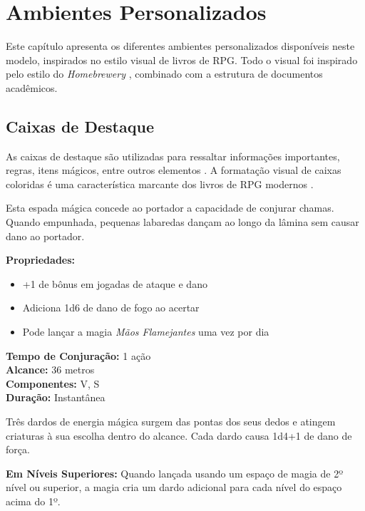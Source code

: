\chapter{Ambientes Personalizados}

Este capítulo apresenta os diferentes ambientes personalizados disponíveis neste modelo, inspirados no estilo visual de livros de RPG. Todo o visual foi inspirado pelo estilo do \textit{Homebrewery} \cite{homebrewery}, combinado com a estrutura de documentos acadêmicos.


\section{Caixas de Destaque}

As caixas de destaque são utilizadas para ressaltar informações importantes, regras, itens mágicos, entre outros elementos \cite{wizardsdnd}. A formatação visual de caixas coloridas é uma característica marcante dos livros de RPG modernos \cite{wizardsdnd5e, paizopathfinder}.

\begin{magicitem}

Esta espada mágica concede ao portador a capacidade de conjurar chamas. Quando empunhada, pequenas labaredas dançam ao longo da lâmina sem causar dano ao portador.

\textbf{Propriedades:}
\begin{itemize}
    \item +1 de bônus em jogadas de ataque e dano
    \item Adiciona 1d6 de dano de fogo ao acertar
    \item Pode lançar a magia \textit{Mãos Flamejantes} uma vez por dia
\end{itemize}
\end{magicitem}

\begin{spell}

\textbf{Tempo de Conjuração:} 1 ação\\
\textbf{Alcance:} 36 metros\\
\textbf{Componentes:} V, S\\
\textbf{Duração:} Instantânea

Três dardos de energia mágica surgem das pontas dos seus dedos e atingem criaturas à sua escolha dentro do alcance. Cada dardo causa 1d4+1 de dano de força.

\textbf{Em Níveis Superiores:} Quando lançada usando um espaço de magia de 2º nível ou superior, a magia cria um dardo adicional para cada nível do espaço acima do 1º.
\end{spell}

